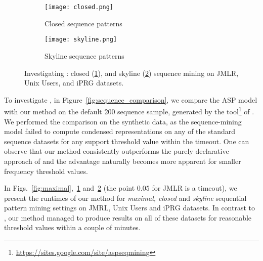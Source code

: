 \begin{figure}[h]
  \centering
  \begin{subfigure}[t]{\textwidth}
  \centering
   \texttt{[image: closed.png]}
   \caption{Closed sequence patterns} %
    \label{fig:closed}
  \end{subfigure}
  \begin{subfigure}[t]{\textwidth}
  \centering
   \texttt{[image: skyline.png]}
   \caption{Skyline sequence patterns} %
    \label{fig:skyline}
  \end{subfigure}
  \caption{Investigating \qone: closed (\ref{fig:closed}), and skyline (\ref{fig:skyline}) sequence mining on  JMLR, Unix Users, and iPRG datasets.}
  \label{fig:qone_part_two}
\end{figure}

To investigate \qone, in Figure~\ref{fig:sequence_comparison}, we compare the ASP model \parencite{DBLP:conf/ijcai/GebserGQ0S16} with our method on the default 200 sequence sample, generated by the tool\footnote{\url{https://sites.google.com/site/aspseqmining}} of \textcite{DBLP:conf/ijcai/GebserGQ0S16}. We %
performed the comparison on the synthetic data, as the sequence-mining model \parencite{DBLP:conf/ijcai/GebserGQ0S16} failed to compute condensed representations on any of the standard sequence datasets for any support threshold value within the timeout. One can observe that our method consistently outperforms the purely declarative approach of \textcite{DBLP:conf/ijcai/GebserGQ0S16} and the advantage naturally becomes more apparent for smaller frequency threshold values. %
 
In Figs.~\ref{fig:maximal},~\ref{fig:closed} and~\ref{fig:skyline} (the point $0.05$ for JMLR is a timeout), we present the runtimes of our method for \emph{maximal, closed} and \emph{skyline} sequential pattern mining settings on JMRL, Unix Users and iPRG datasets. In contrast to \textcite{DBLP:conf/ijcai/GebserGQ0S16}, our method managed to produce results on all of these datasets for reasonable threshold values within a couple of minutes.


